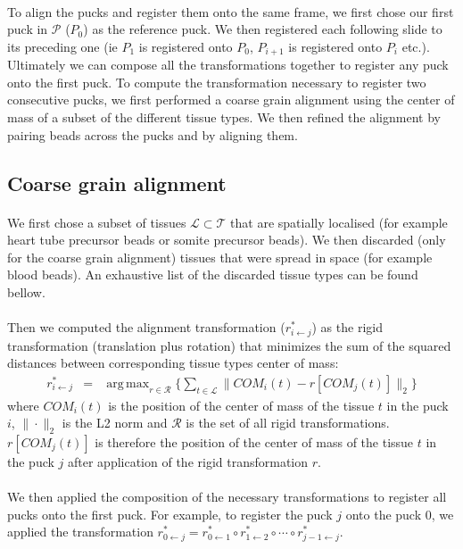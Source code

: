 \documentclass[10pt,a4paper]{article}
\DeclareMathOperator*{\argmax}{arg\,max}
\begin{document}
\paragraph{}To align the pucks and register them onto the same frame, we first chose our first puck in \(\mathcal{P}\) (\(P_0\)) as the reference puck.
We then registered each following slide to its preceding one (ie \(P_1\) is registered onto \(P_0\), \(P_{i+1}\) is registered onto \(P_{i}\) etc.).
Ultimately we can compose all the transformations together to register any puck onto the first puck.
To compute the transformation necessary to register two consecutive pucks, we first performed a coarse grain alignment using the center of mass of a subset of the different tissue types.
We then refined the alignment by pairing beads across the pucks and by aligning them.
\subsection{Coarse grain alignment}
\paragraph{}We first chose a subset of tissues \(\mathcal{L}\subset\mathcal{T}\) that are spatially localised (for example heart tube precursor beads or {somite precursor} beads). 
We then discarded (only for the coarse grain alignment) tissues that were spread in space (for example {blood} beads).
An exhaustive list of the discarded tissue types can be found bellow.
\paragraph{}Then we computed the alignment transformation (\(r_{i\leftarrow j}^*\)) as the rigid transformation (translation plus rotation) that minimizes the sum of the squared distances between corresponding tissue types center of mass:
\begin{eqnarray}\label{eq:rigid}
r_{i\leftarrow j}^*&=&\argmax_{r\in\mathcal{R}} \big\{\sum_{t\in \mathcal{L}}\| COM_i(t)-r[COM_j(t)]\|_2\big\}
\end{eqnarray}
where \(COM_i(t)\) is the position of the center of mass of the tissue \(t\) in the puck \(i\), \(\|\cdot\|_2\) is the L2 norm and \(\mathcal{R}\) is the set of all rigid transformations.
\(r[COM_j(t)]\) is therefore the position of the center of mass of the tissue \(t\) in the puck \(j\) after application of the rigid transformation \(r\).
\paragraph{}We then applied the composition of the necessary transformations to register all pucks onto the first puck.
For example, to register the puck \(j\) onto the puck \(0\), we applied the transformation \(r_{0\leftarrow j}^*=r_{0\leftarrow 1}^*\circ r_{1\leftarrow 2}^*\circ \cdots \circ r_{j-1\leftarrow j}^*\).
\end{document}
